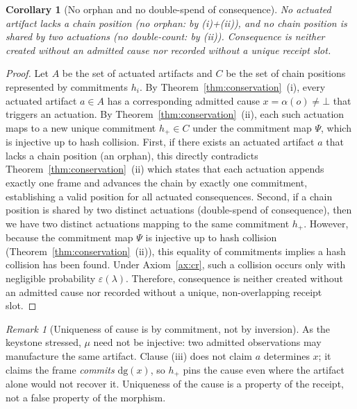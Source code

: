 \documentclass[11pt,oneside]{book}
\theoremstyle{definition}
\theoremstyle{plain}
\newtheorem{corollary}[theorem]{Corollary}
\theoremstyle{remark}
\newtheorem*{remark}{Remark}
\newcommand{\muop}{\mu}                        %
\newcommand{\adm}{\alpha}                      %
\newcommand{\Rfsl}{\bot}                        %
\newcommand{\dg}{\mathrm{dg}}                   %
\begin{document}
\begin{corollary}[No orphan and no double-spend of consequence]\label{cor:orphan}
No actuated artifact lacks a chain position (\emph{no orphan}: by (i)+(ii)), and no chain
position is shared by two actuations (\emph{no double-count}: by (ii)). %
Consequence is
neither created without an admitted cause nor recorded without a unique receipt slot. %
\end{corollary}
\begin{proof}
Let $A$ be the set of actuated artifacts and $C$ be the set of chain positions represented by commitments $h_i$. %
By Theorem~\ref{thm:conservation}~(i), every actuated artifact $a \in A$ has a corresponding admitted cause $x = \adm(o) \neq \Rfsl$ that triggers an actuation. %
By Theorem~\ref{thm:conservation}~(ii), each such actuation maps to a new unique commitment $h_+ \in C$ under the commitment map $\Psi$, which is injective up to hash collision. %
First, if there exists an actuated artifact $a$ that lacks a chain position (an orphan), this directly contradicts Theorem~\ref{thm:conservation}~(ii) which states that each actuation appends exactly one frame and advances the chain by exactly one commitment, establishing a valid position for all actuated consequences. %
Second, if a chain position is shared by two distinct actuations (double-spend of consequence), then we have two distinct actuations mapping to the same commitment $h_+$. %
However, because the commitment map $\Psi$ is injective up to hash collision (Theorem~\ref{thm:conservation}~(ii)), this equality of commitments implies a hash collision has been found. %
Under Axiom~\ref{ax:cr}, such a collision occurs only with negligible probability $\varepsilon(\lambda)$. %
Therefore, consequence is neither created without an admitted cause nor recorded without a unique, non-overlapping receipt slot. %
\end{proof}

\begin{remark}[Uniqueness of cause is by commitment, not by inversion]
As the keystone stressed, $\muop$ need not be injective: two admitted observations may
manufacture the same artifact. %
Clause (iii) does not claim $a$ determines $x$; it claims the
frame \emph{commits} $\dg(x)$, so $h_{+}$ pins the cause even where the artifact alone would
not recover it. %
Uniqueness of the cause is a property of the receipt, not a false property of
the morphism. %
\end{remark}
\end{document}
